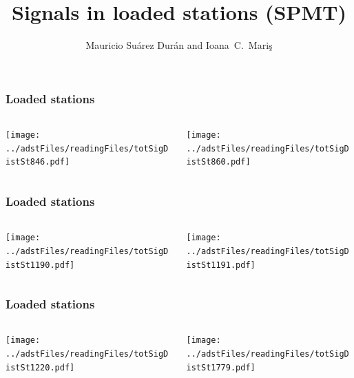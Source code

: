 \documentclass[aspectratio=169]{beamer}
\title{Signals in loaded stations (SPMT)}
\author{
  Mauricio Su\'arez Dur\'an and Ioana~C.~Mari\c{s}
}
\institute{IIHE-ULB}
\begin{document}
\begin{frame}
  \titlepage
\end{frame}


\begin{frame}
  \frametitle{Loaded stations}
  \begin{columns}
    \begin{column}{0.48\textwidth}
      \texttt{[image: ../adstFiles/readingFiles/totSigDistSt846.pdf]}
    \end{column}
    \begin{column}{0.48\textwidth}
      \texttt{[image: ../adstFiles/readingFiles/totSigDistSt860.pdf]}
    \end{column}
  \end{columns}
\end{frame}

\begin{frame}
  \frametitle{Loaded stations}
  \begin{columns}
    \begin{column}{0.48\textwidth}
      \texttt{[image: ../adstFiles/readingFiles/totSigDistSt1190.pdf]}
    \end{column}
    \begin{column}{0.48\textwidth}
      \texttt{[image: ../adstFiles/readingFiles/totSigDistSt1191.pdf]}
    \end{column}
  \end{columns}
\end{frame}

\begin{frame}
  \frametitle{Loaded stations}
  \begin{columns}
    \begin{column}{0.48\textwidth}
      \texttt{[image: ../adstFiles/readingFiles/totSigDistSt1220.pdf]}
    \end{column}
    \begin{column}{0.48\textwidth}
      \texttt{[image: ../adstFiles/readingFiles/totSigDistSt1779.pdf]}
    \end{column}
  \end{columns}
\end{frame}
\end{document}

